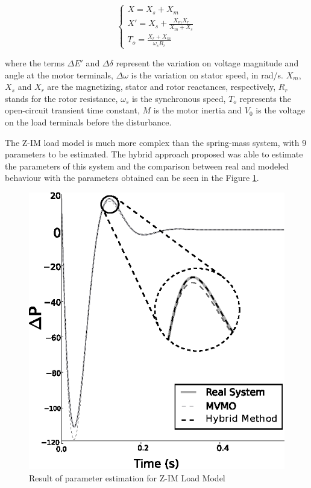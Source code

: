 \begin{equation}
    \begin{cases}
    X = X_{s} + X_{m} \\
    X' = X_{s} + \frac{X_{m} X_{r}}{X_{m} + X_{s}} \\
    T_{o} = \frac{X_{r} + X_{m}}{\omega_{s} R_{r}}
    \end{cases}
    \label{eq: terms}
\end{equation}

\noindent where the terms $\Delta E'$ and $\Delta \delta$ represent the variation on voltage magnitude and angle at the motor terminals, $\Delta \omega$ is the variation on stator speed, in rad/s. $X_m$, $X_s$ and $X_r$ are the magnetizing, stator and rotor reactances, respectively, $R_r$ stands for the rotor resistance, $\omega_{s}$ is the synchronous speed, $T_o$ represents the open-circuit transient time constant, $M$ is the motor inertia and $V_{0}$ is the voltage on the load terminals before the disturbance.

The Z-IM load model is much more complex than the spring-mass system, with 9 parameters to be estimated. The hybrid approach proposed was able to estimate the parameters of this system and the comparison between real and modeled behaviour with the parameters obtained can be seen in the Figure \ref{fig: ZIM}.

\begin{figure}[h]
	\caption{Result of parameter estimation for Z-IM Load Model}
	\begin{center}
		\includegraphics[scale=1]{Images/ZIM.eps}
	\end{center}
	\label{fig: ZIM}
\end{figure}

